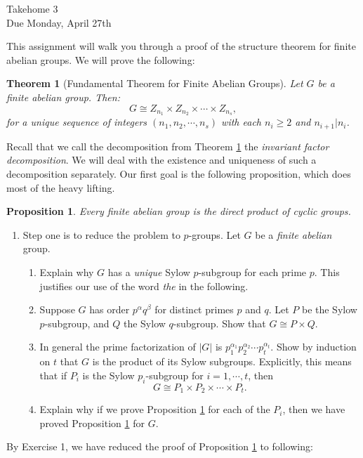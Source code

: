 \documentclass[11pt]{article}
\newtheorem{theorem}{Theorem}
\newtheorem{proposition}{Proposition}
\begin{document}
\begin{center}
\Large {Takehome 3}\\
\small {Due Monday, April 27th}
\end{center}
This assignment will walk you through a proof of the structure theorem for finite abelian groups.  We will prove the following:
\begin{theorem}[Fundamental Theorem for Finite Abelian Groups]\label{fundamental}
  Let $G$ be a finite abelian group.  Then:
  \[G\cong Z_{n_1}\times Z_{n_2}\times\cdots\times Z_{n_s},\]
  for a unique sequence of integers $(n_1,n_2,\cdots,n_s)$ with each $n_i\ge 2$ and $n_{i+1}|n_i$.
\end{theorem}
Recall that we call the decomposition from Theorem \ref{fundamental} the \textit{invariant factor decomposition}.  We will deal with the existence and uniqueness of such a decomposition separately.  Our first goal is the following proposition, which does most of the heavy lifting.
\begin{proposition}\label{main}
  Every finite abelian group is the direct product of cyclic groups.
\end{proposition}
\begin{enumerate}
  \item{
  Step one is to reduce the problem to $p$-groups.  Let $G$ be a \textit{finite abelian} group.
  \begin{enumerate}
    \item{
    Explain why $G$ has a \textit{unique} Sylow $p$-subgroup for each prime $p$.  This justifies our use of the word \textit{the} in the following.
    }
    \item{
    Suppose $G$ has order $p^\alpha q^\beta$ for distinct primes $p$ and $q$.  Let $P$ be the Sylow $p$-subgroup, and $Q$ the Sylow $q$-subgroup.  Show that $G\cong P\times Q$.
    }
    \item{
    In general the prime factorization of $|G|$ is $p_1^{\alpha_1}p_2^{\alpha_2}\cdots p_t^{\alpha_t}$.  Show by induction on $t$ that $G$ is the product of its Sylow subgroups.  Explicitly, this means that if $P_i$ is the Sylow $p_i$-subgroup for $i= 1,\cdots,t$, then
    \[G\cong P_1\times P_2\times\cdots\times P_t.\]
    }
    \item{
    Explain why if we prove Proposition \ref{main} for each of the $P_i$, then we have proved Proposition \ref{main} for $G$.
    }
  \end{enumerate}
  }
\end{enumerate}
By Exercise 1, we have reduced the proof of Proposition \ref{main} to following:
\end{document}
